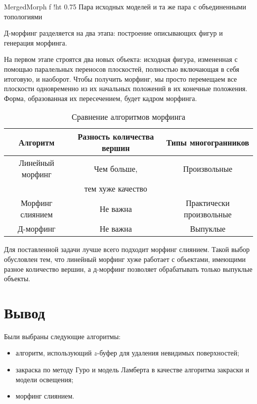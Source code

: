 {MergedMorph}
{f}
{!ht}
{0.75\textwidth}
{Пара исходных моделей и та же пара с объединенными топологиями}

\leavevmode

Д-морфинг разделяется на два этапа: построение описывающих фигур и генерация морфинга.

На первом этапе строятся два новых объекта: исходная фигура, измененная с помощью паралельных переносов плоскостей, полностью включающая в себя итоговую, и наоборот.  Чтобы получить морфинг, мы просто перемещаем все плоскости одновременно из их начальных положений в их конечные положения. Форма, образованная их пересечением, будет кадром морфинга.~\cite{DMorph}

\begin{table}[ht]
	\small
	\begin{center}
		\begin{threeparttable}
			\caption{Сравнение алгоритмов морфинга}
			\label{tbl:test_morph}
			\begin{tabular}{|c|c|c|}
				\hline
				\bfseries Алгоритм & \bfseries Разность количества вершин & \bfseries Типы многогранников \\
				\hline
				Линейный морфинг & Чем больше, & Произвольные \\
				& тем хуже качество & \\
				\hline
				Морфинг слиянием & Не важна & Практически произвольные \\
				\hline
				Д-морфинг & Не важна & Выпуклые \\
				\hline
			\end{tabular}
		\end{threeparttable}
	\end{center}
\end{table}

Для поставленной задачи лучше всего подходит морфинг слиянием. Такой выбор обусловлен тем, что линейный морфинг хуже работает с объектами, имеющими разное количество вершин, а д-морфинг позволяет обрабатывать только выпуклые объекты.

\section*{Вывод}
Были выбраны следующие алгоритмы:
\begin{itemize}[label*=---]
	\item алгоритм, использующий $z$-буфер для удаления невидимых поверхностей;
	\item закраска по методу Гуро и модель Ламберта в качестве алгоритма закраски и модели освещения;
	\item морфинг слиянием.
\end{itemize}